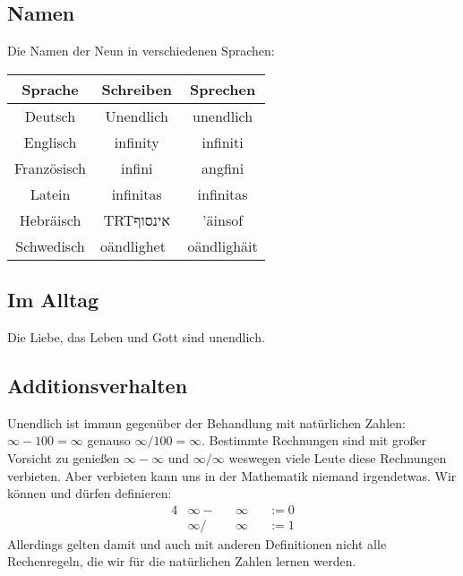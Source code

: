 \documentclass[a4paper]{amsart}
\newcommand{\texthebrew}[1]{\bgroup\textdir TRT\hebrewfont #1\egroup}
\theoremstyle{definition}
\begin{document}
\subsection{Namen}
Die Namen der Neun in verschiedenen Sprachen:
\vspace{\kategoryVspace}

\begin{tabular}{|c|c|c|}
   \hline
   \textbf{Sprache}& \textbf{Schreiben} & \textbf{Sprechen} \\
   \hline
   Deutsch     &Unendlich   &unendlich      \\
   \hline
   Englisch    &infinity   &infiniti      \\
   \hline
   Französisch &infini   &angfini      \\
   \hline
   Latein      &infinitas  &infinitas     \\
   \hline
   Hebräisch   &\texthebrew{אינסוף}    &'äinsof \\
   \hline
   Schwedisch  &oändlighet    &oändlighäit     \\
   \hline
\end{tabular}

\subsection{Im Alltag}
Die Liebe, das Leben und Gott sind unendlich.

\subsection{Additionsverhalten}
Unendlich ist immun gegenüber der Behandlung mit natürlichen Zahlen:
$\infty -100 = \infty$ genauso $\infty / 100 = \infty$. Bestimmte Rechnungen sind mit großer Vorsicht zu genießen $\infty - \infty$ und $\infty / \infty$ weswegen viele Leute diese Rechnungen verbieten. Aber verbieten kann uns in der Mathematik niemand irgendetwas. Wir können und dürfen definieren:
\begin{alignat}{4}
    &\infty - &&\infty &&:= 0\\
    &\infty / &&\infty &&:= 1
\end{alignat}
Allerdings gelten damit und auch mit anderen Definitionen nicht alle Rechenregeln, die wir für die natürlichen Zahlen lernen werden.
\end{document}
